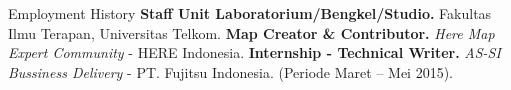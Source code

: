 \begin{rubric}{Employment History}
\entry*[2017 -- 2018]%
	\textbf{Staff Unit Laboratorium/Bengkel/Studio.} Fakultas Ilmu Terapan, Universitas Telkom.
%
%
\entry*[2015 -- 2016]%
	\textbf{Map Creator \& Contributor.} \textit{Here Map Expert Community} - HERE Indonesia.
%
\entry*[2015]%
	\textbf{Internship - Technical Writer.} \textit{AS-SI Bussiness Delivery} - PT. Fujitsu Indonesia. (Periode Maret -- Mei 2015).

%
\end{rubric}